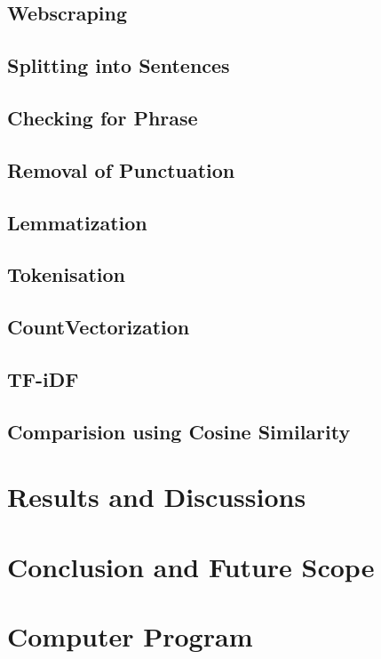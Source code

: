 \documentclass[a4paper,12pt]{article}
\begin{document}
		\subsection{Webscraping}
		\subsection{Splitting into Sentences}
		\subsection{Checking for Phrase}
		\subsection{Removal of Punctuation}
		\subsection{Lemmatization}
		\subsection{Tokenisation}
		\subsection{CountVectorization}
		\subsection{TF-iDF}
		\subsection{Comparision using Cosine Similarity}
	\section{Results and Discussions}
	\section{Conclusion and Future Scope}
	\section{Computer Program}
	
	
\end{document}

